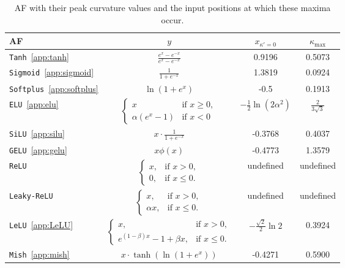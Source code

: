 \documentclass{article}
\begin{document}
\begin{table}
    \centering
  \caption{AF with their peak curvature values and the input positions at which these maxima occur.}
  \label{tab:AF}
  \begin{tabular}{@{}lccc@{}}
    \toprule
    AF & $y$ & $x_{\kappa' = 0}$ & $\kappa_{\text{max}}$\\
    \midrule
    \texttt{Tanh}~\ref{app:tanh} & $\frac{e^{x} - e^{-x}}{e^{x} - e^{-x}}$ & 0.9196 & 0.5073\\
    \texttt{Sigmoid}~\ref{app:sigmoid} & $\frac{1}{1 + e^{-x}}$ & 1.3819 & 0.0924\\
    \texttt{Softplus}~\ref{app:softplus} & $\ln{({1 + e^{x}})}$ & -0.5 & 0.1913\\
    \texttt{ELU}~\ref{app:elu} & $
    \begin{cases}
      x & \text{if } x \geq 0, \\
      \alpha (e^x - 1) & \text{if } x < 0
    \end{cases}$ & $-\frac{1}{2} \ln(2 \alpha^2)$ & $\frac{2}{3\sqrt3}$\\
    \texttt{SiLU}~\ref{app:silu} & $x \cdot \frac{1}{1 + e^{-x}}$ & -0.3768 & 0.4037 \\
    \texttt{GELU}~\ref{app:gelu} & $x \phi(x)$ & -0.4773 & 1.3579\\
    \texttt{ReLU} & $
    \begin{cases}
    x, & \text{if } x > 0, \\
    0, & \text{if } x \le 0.
    \end{cases}$ & undefined & undefined\\
    \texttt{Leaky-ReLU} & $
    \begin{cases}
    x, & \text{if } x > 0, \\
    \alpha x, & \text{if } x \le 0.
    \end{cases}$ & undefined & undefined\\
    \texttt{LeLU}~\ref{app:LeLU} & $
    \begin{cases}
    x, & \text{if } x > 0, \\
    e^{(1 - \beta)x} - 1 + \beta x, & \text{if } x \le 0.
    \end{cases}$ & $- \frac{\sqrt{2}}{2}\ln2$ & 0.3924\\
    \texttt{Mish}~\ref{app:mish} & $x \cdot \tanh\!\left(\ln(1 + e^{x})\right)$ & -0.4271 & 0.5900\\
  \bottomrule
\end{tabular}
\end{table}
\end{document}
